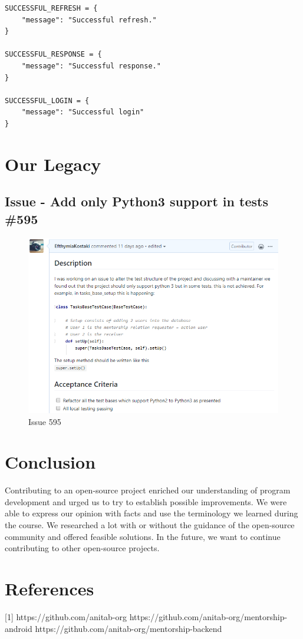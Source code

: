 \documentclass{article}
\begin{document}
\begin{itemize}
\begin{lstlisting}
SUCCESSFUL_REFRESH = {
    "message": "Successful refresh."
}

SUCCESSFUL_RESPONSE = {
    "message": "Successful response."
}

SUCCESSFUL_LOGIN = {
    "message": "Successful login"
}
\end{lstlisting}
\end{itemize}

\section{Our Legacy}
\subsection{Issue - Add only Python3 support in tests \#595}
\begin{figure}[tph!]
\centerline{\includegraphics[totalheight=10cm, width=15cm]{issue595.png}}
    \caption{Issue 595}
    \label{fig:verticalcell}
\end{figure}
\vfill
\clearpage
\section{Conclusion}
Contributing to an open-source project
 enriched our understanding  of program 
development and urged us to try to establish 
possible improvements. We were able to express
 our opinion with facts and use the terminology we
 learned during the course. We researched a lot with
 or without the guidance of the open-source community
 and offered feasible solutions. In the future, we want
 to continue contributing to other open-source projects.
\section*{References}
[1] https://github.com/anitab-org
\newline
[2] https://github.com/anitab-org/mentorship-android
\newline
[3] https://github.com/anitab-org/mentorship-backend
\end{document}
